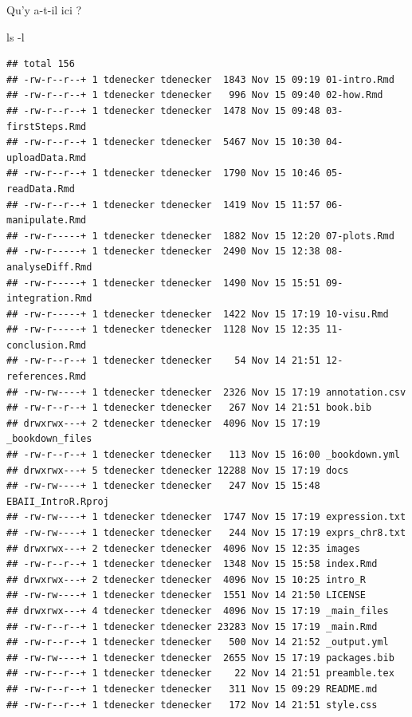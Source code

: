 \documentclass[
]{book}
\newenvironment{Shaded}{\begin{snugshade}}{\end{snugshade}}
\newcommand{\AttributeTok}[1]{\textcolor[rgb]{0.77,0.63,0.00}{#1}}
\newcommand{\FunctionTok}[1]{\textcolor[rgb]{0.00,0.00,0.00}{#1}}
\begin{document}
Qu'y a-t-il ici ?

\begin{Shaded}
\begin{Highlighting}[]
\FunctionTok{ls} \AttributeTok{{-}l}
\end{Highlighting}
\end{Shaded}

\begin{verbatim}
## total 156
## -rw-r--r--+ 1 tdenecker tdenecker  1843 Nov 15 09:19 01-intro.Rmd
## -rw-r--r--+ 1 tdenecker tdenecker   996 Nov 15 09:40 02-how.Rmd
## -rw-r--r--+ 1 tdenecker tdenecker  1478 Nov 15 09:48 03-firstSteps.Rmd
## -rw-r--r--+ 1 tdenecker tdenecker  5467 Nov 15 10:30 04-uploadData.Rmd
## -rw-r--r--+ 1 tdenecker tdenecker  1790 Nov 15 10:46 05-readData.Rmd
## -rw-r--r--+ 1 tdenecker tdenecker  1419 Nov 15 11:57 06-manipulate.Rmd
## -rw-r-----+ 1 tdenecker tdenecker  1882 Nov 15 12:20 07-plots.Rmd
## -rw-r-----+ 1 tdenecker tdenecker  2490 Nov 15 12:38 08-analyseDiff.Rmd
## -rw-r-----+ 1 tdenecker tdenecker  1490 Nov 15 15:51 09-integration.Rmd
## -rw-r-----+ 1 tdenecker tdenecker  1422 Nov 15 17:19 10-visu.Rmd
## -rw-r-----+ 1 tdenecker tdenecker  1128 Nov 15 12:35 11-conclusion.Rmd
## -rw-r--r--+ 1 tdenecker tdenecker    54 Nov 14 21:51 12-references.Rmd
## -rw-rw----+ 1 tdenecker tdenecker  2326 Nov 15 17:19 annotation.csv
## -rw-r--r--+ 1 tdenecker tdenecker   267 Nov 14 21:51 book.bib
## drwxrwx---+ 2 tdenecker tdenecker  4096 Nov 15 17:19 _bookdown_files
## -rw-r--r--+ 1 tdenecker tdenecker   113 Nov 15 16:00 _bookdown.yml
## drwxrwx---+ 5 tdenecker tdenecker 12288 Nov 15 17:19 docs
## -rw-rw----+ 1 tdenecker tdenecker   247 Nov 15 15:48 EBAII_IntroR.Rproj
## -rw-rw----+ 1 tdenecker tdenecker  1747 Nov 15 17:19 expression.txt
## -rw-rw----+ 1 tdenecker tdenecker   244 Nov 15 17:19 exprs_chr8.txt
## drwxrwx---+ 2 tdenecker tdenecker  4096 Nov 15 12:35 images
## -rw-r--r--+ 1 tdenecker tdenecker  1348 Nov 15 15:58 index.Rmd
## drwxrwx---+ 2 tdenecker tdenecker  4096 Nov 15 10:25 intro_R
## -rw-rw----+ 1 tdenecker tdenecker  1551 Nov 14 21:50 LICENSE
## drwxrwx---+ 4 tdenecker tdenecker  4096 Nov 15 17:19 _main_files
## -rw-r--r--+ 1 tdenecker tdenecker 23283 Nov 15 17:19 _main.Rmd
## -rw-r--r--+ 1 tdenecker tdenecker   500 Nov 14 21:52 _output.yml
## -rw-rw----+ 1 tdenecker tdenecker  2655 Nov 15 17:19 packages.bib
## -rw-r--r--+ 1 tdenecker tdenecker    22 Nov 14 21:51 preamble.tex
## -rw-r--r--+ 1 tdenecker tdenecker   311 Nov 15 09:29 README.md
## -rw-r--r--+ 1 tdenecker tdenecker   172 Nov 14 21:51 style.css
\end{verbatim}
\end{document}
